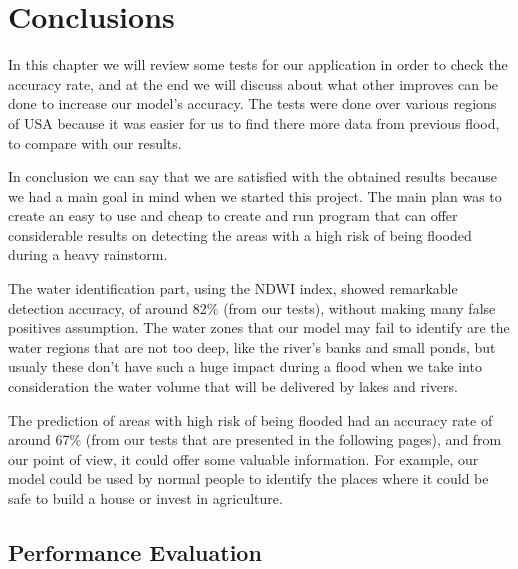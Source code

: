 \documentclass[12pt, a4paper]{report}
\begin{document}
\newpage



\newpage{}

\chapter{Conclusions}

\quad 

In this chapter we will review some tests for our application in order to check the accuracy rate, and at the end we will discuss about what other improves can be done to increase our model's accuracy. The tests were done over various regions of USA because it was easier for us to find there more data from previous flood, to compare with our results.
\par 

In conclusion we can say that we are satisfied with the obtained results because we had a main goal in mind when we started this project. The main plan was to create an easy to use and cheap to create and run program that can offer considerable results on detecting the areas with a high risk of being flooded during a heavy rainstorm.
\par 

The water identification part, using the NDWI index, showed remarkable detection accuracy, of around 82\% (from our tests), without making many false positives assumption. The water zones that our model may fail to identify are the water regions that are not too deep, like the river's banks and small ponds, but usualy these don't have such a huge impact during a flood when we take into consideration the water volume that will be delivered by lakes and rivers.
\par 

The prediction of areas with high risk of being flooded had an accuracy rate of around 67\% (from our tests that are presented in the following pages), and from our point of view, it could offer some valuable information. For example, our model could be used by normal people to identify the places where it could be safe to build a house or invest in agriculture.

\newpage

\section{Performance Evaluation} 
\end{document}

